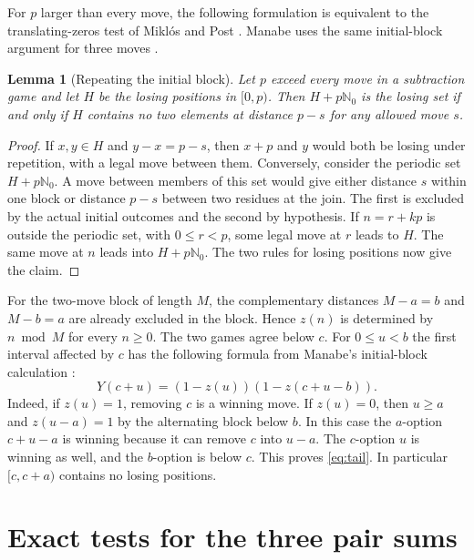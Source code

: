 \documentclass[11pt]{article}
\newtheorem{lemma}[theorem]{Lemma}
\newcommand{\N}{\mathbb{N}_0}
\begin{document}
For $p$ larger than every move, the following formulation is equivalent
to the translating-zeros test of Mikl\'os and Post \cite[Lemma~9]{miklos-post}.
Manabe uses the same initial-block argument for three moves \cite[\S3]{manabe}.

\begin{lemma}[Repeating the initial block]\label{lem:repeat}
Let $p$ exceed every move in a subtraction game and let $H$ be the
losing positions in $[0,p)$. Then $H+p\N$ is the losing set if and only
if $H$ contains no two elements at distance $p-s$ for any allowed
move $s$.
\end{lemma}

\begin{proof}
If $x,y\in H$ and $y-x=p-s$, then $x+p$ and $y$ would both be losing
under repetition, with a legal move between them. Conversely, consider
the periodic set $H+p\N$. A move between members of this set would give
either distance $s$ within one block or distance $p-s$ between two
residues at the join. The first is excluded by the actual initial
outcomes and the second by hypothesis. If $n=r+kp$ is outside the
periodic set, with $0\le r<p$, some legal move at $r$ leads to $H$.
The same move at $n$ leads into $H+p\N$. The two rules for losing
positions now give the claim.
\end{proof}

For the two-move block of length $M$, the complementary distances
$M-a=b$ and $M-b=a$ are already excluded in the block. Hence
$z(n)$ is determined by $n\bmod M$ for every $n\ge 0$.
The two games agree below $c$. For $0\le u<b$ the first interval
affected by $c$ has the following formula from Manabe's initial-block calculation
\cite[\S3]{manabe}:
\begin{equation}\label{eq:tail}
 Y(c+u)=(1-z(u))(1-z(c+u-b)).
\end{equation}
Indeed, if $z(u)=1$, removing $c$ is a winning move. If $z(u)=0$,
then $u\ge a$ and $z(u-a)=1$ by the alternating block below $b$.
In this case the $a$-option $c+u-a$ is winning because it can remove
$c$ into $u-a$. The $c$-option $u$ is winning as well, and the
$b$-option is below $c$. This proves \eqref{eq:tail}. In particular
$[c,c+a)$ contains no losing positions.

\section{Exact tests for the three pair sums}
\end{document}
